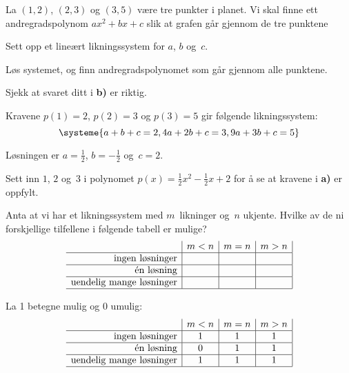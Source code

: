 \begin{oppgave}
	La $(1,2)$, $(2,3)$ og $(3,5)$ være tre punkter i planet. Vi skal finne ett andregradspolynom $ax^2 + bx + c$ slik
	at grafen går gjennom de tre punktene
	\begin{punkt}
		Sett opp et lineært likningssystem for $a$, $b$ og~$c$.
	\end{punkt}
	\begin{punkt}
		Løs systemet, og finn andregradspolynomet som går gjennom alle punktene.
	\end{punkt}
	\begin{punkt}
		Sjekk at svaret ditt i \textbf{b)} er riktig.
	\end{punkt}
\end{oppgave}
\begin{losning}
	\begin{punkt}
		Kravene $p(1)=2$, $p(2)=3$ og $p(3)=5$ gir følgende likningssystem:
		$$
		\systeme{
			a+b+c = 2,
			4a+2b+c = 3,
			9a+3b+c = 5
		}
		$$
		
	\end{punkt}
	\begin{punkt}
		Løsningen er $a=\frac{1}{2}$, $b=-\frac{1}{2}$ og~$c=2$.
	\end{punkt}
	
	\begin{punkt}
		Sett inn $1$, $2$ og~$3$ i polynomet $p(x)=\frac{1}{2}x^2-\frac{1}{2}x+2$ for å se at kravene i \textbf{a)} er oppfylt.  
	\end{punkt}
\end{losning}


\begin{oppgave}
Anta at vi har et likningssystem med $m$~likninger og~$n$ ukjente.
Hvilke av de ni forskjellige tilfellene i følgende tabell er mulige?
\[
\begin{array}{r|c|c|c|}
                                & m < n & m = n & m > n \\ \hline
\text{ingen løsninger}          &       &       &       \\ \hline
\text{én løsning}               &       &       &       \\ \hline
\text{uendelig mange løsninger} &       &       &       \\ \hline
\end{array}
\]
\end{oppgave}

\begin{losning}

La 1 betegne mulig og 0 umulig:
\[
\begin{array}{r|c|c|c|}
& m < n & m = n & m > n \\ \hline
\text{ingen løsninger}          &   1   &   1   &   1   \\ \hline
\text{én løsning}               &   0   &   1   &   1   \\ \hline
\text{uendelig mange løsninger} &   1   &   1   &   1   \\ \hline
\end{array}
\]
\end{losning}


